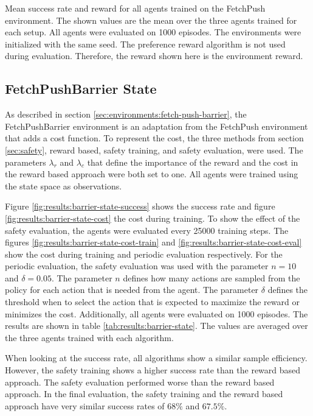 \begin{table}[btp]
    \centering
    
    \caption[Mean success rate and reward for all agents trained on the FetchPush environment.]{Mean success rate and reward for all agents trained on the FetchPush environment. The shown values are the mean over the three agents trained for each setup. All agents were evaluated on 1000 episodes. The environments were initialized with the same seed. The preference reward algorithm is not used during evaluation. Therefore, the reward shown here is the environment reward.}
    \label{tab:results:push}
\end{table}

\subsection{FetchPushBarrier State}
\label{sec:results:fetch-push-barrier-state}

As described in section \ref{sec:environments:fetch-push-barrier}, the FetchPushBarrier environment is an adaptation from the FetchPush environment that adds a cost function. To represent the cost, the three methods from section \ref{sec:safety}, reward based, safety training, and safety evaluation, were used. The parameters $\lambda_r$ and $\lambda_c$ that define the importance of the reward and the cost in the reward based approach were both set to one. All agents were trained using the state space as observations. 

Figure \ref{fig:results:barrier-state-success} shows the success rate and figure \ref{fig:results:barrier-state-cost} the cost during training. To show the effect of the safety evaluation, the agents were evaluated every 25000 training steps. The figures \ref{fig:results:barrier-state-cost-train} and \ref{fig:results:barrier-state-cost-eval} show the cost during training and periodic evaluation respectively. For the periodic evaluation, the safety evaluation was used with the parameter $n=10$ and $\delta=0.05$. The parameter $n$ defines how many actions are sampled from the policy for each action that is needed from the agent. The parameter $\delta$ defines the threshold when to select the action that is expected to maximize the reward or minimizes the cost. Additionally, all agents were evaluated on 1000 episodes. The results are shown in table \ref{tab:results:barrier-state}. The values are averaged over the three agents trained with each algorithm.

When looking at the success rate, all algorithms show a similar sample efficiency. However, the safety training shows a higher success rate than the reward based approach. The safety evaluation performed worse than the reward based approach. In the final evaluation, the safety training and the reward based approach have very similar success rates of $68\%$ and $67.5\%$.

